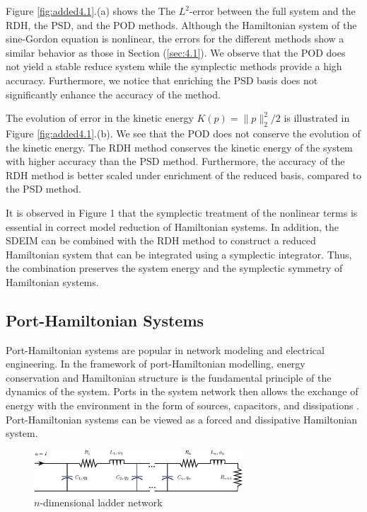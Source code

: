 Figure \ref{fig:added4.1}.(a) shows the The $L^2$-error between the full system and the RDH, the PSD, and the POD methods. Although the Hamiltonian system of the sine-Gordon equation is nonlinear, the errors for the different methods show a similar behavior as those in Section (\ref{sec:4.1}). We observe that the POD does not yield a stable reduce system while the symplectic methods provide a high accuracy. Furthermore, we notice that enriching the PSD basis does not significantly enhance the accuracy of the method.

The evolution of error in the kinetic energy $K(p) = \|p\|_2^2/2$ is illustrated in Figure \ref{fig:added4.1}.(b). We see that the POD does not conserve the evolution of the kinetic energy. The RDH method conserves the kinetic energy of the system with higher accuracy than the PSD method. Furthermore, the accuracy of the RDH method is better scaled under enrichment of the reduced basis, compared to the PSD method. 

It is observed in Figure 1 that the symplectic treatment of the nonlinear terms is essential in correct model reduction of Hamiltonian systems. In addition, the SDEIM can be combined with the RDH method to construct a reduced Hamiltonian system that can be integrated using a symplectic integrator. Thus, the combination preserves the system energy and the symplectic symmetry of Hamiltonian systems.

\subsection{Port-Hamiltonian Systems}
Port-Hamiltonian systems are popular in network modeling and electrical engineering. In the framework of port-Hamiltonian modelling, energy conservation and Hamiltonian structure is the fundamental principle of the dynamics of the system. Ports in the system network then allows the exchange of energy with the environment in the form of sources, capacitors, and dissipations \cite{vanderSchaft:2014:PST:2693645.2693646}. Port-Hamiltonian systems can be viewed as a forced and dissipative Hamiltonian system.
\begin{figure}[t]
\begin{center}
	\includegraphics[width=0.7\textwidth]{./figs/porthamil/circuit}
\end{center}
\caption{$n$-dimensional ladder network} \label{fig:4.2}
\end{figure}

